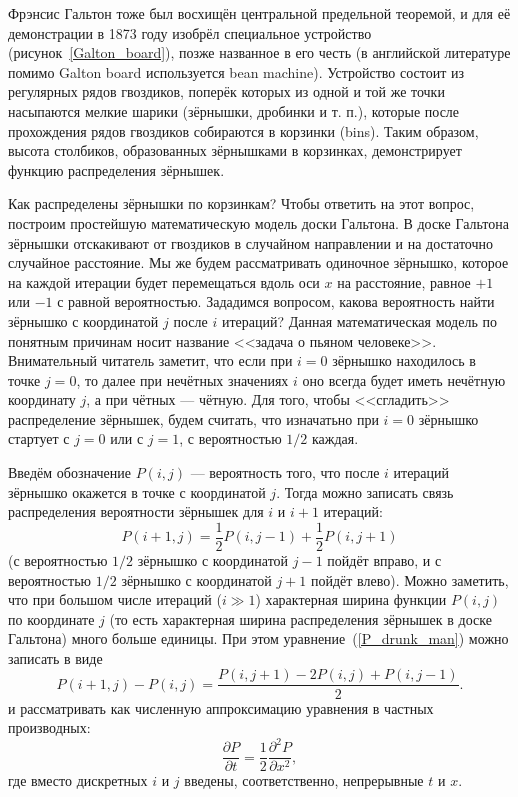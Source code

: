\documentclass{book}
\begin{document}
Фрэнсис Гальтон тоже был восхищён центральной предельной теоремой, и для её демонстрации в 1873
году изобрёл специальное устройство (рисунок~\ref{Galton_board}), позже названное в его честь (в
английской литературе помимо Galton board используется bean machine). Устройство состоит из
регулярных рядов гвоздиков, поперёк которых из одной и той же точки насыпаются мелкие шарики
(зёрнышки, дробинки и т. п.), которые после прохождения рядов гвоздиков собираются в корзинки
(bins). Таким образом, высота столбиков, образованных зёрнышками в корзинках, демонстрирует функцию
распределения зёрнышек.

Как распределены зёрнышки по корзинкам? Чтобы ответить на этот вопрос, построим простейшую
математическую модель доски Гальтона. В доске Гальтона зёрнышки отскакивают от гвоздиков в
случайном направлении и на достаточно случайное расстояние. Мы же будем рассматривать одиночное
зёрнышко, которое на каждой итерации будет перемещаться вдоль оси $x$ на расстояние, равное $+1$
или $-1$ с равной вероятностью. Зададимся вопросом, какова вероятность найти зёрнышко с координатой
$j$ после $i$ итераций?  Данная математическая модель по понятным причинам носит название
<<задача о пьяном человеке>>.  Внимательный читатель заметит, что если при $i = 0$ зёрнышко
находилось в точке $j = 0$, то далее при нечётных значениях $i$ оно всегда будет иметь нечётную
координату $j$, а при чётных --- чётную.  Для того, чтобы <<сгладить>> распределение зёрнышек,
будем считать, что изначатьно при $i = 0$ зёрнышко стартует с $j = 0$ или с $j = 1$, с вероятностью
$1/2$ каждая.


Введём обозначение $P(i, j)$ --- вероятность того, что после $i$ итераций зёрнышко окажется в точке с
координатой $j$. Тогда можно записать связь распределения вероятности зёрнышек для $i$ и $i+1$
итераций:
\begin{equation}
    \label{P_drunk_man}
    P(i+1, j) = \frac{1}{2} P(i, j - 1) + \frac{1}{2} P(i, j + 1)
\end{equation}
(с вероятностью $1/2$ зёрнышко с координатой $j - 1$ пойдёт вправо, и с вероятностью $1/2$ зёрнышко
с координатой $j + 1$ пойдёт влево).
Можно заметить, что при большом числе итераций ($i \gg 1$) характерная ширина
функции $P(i, j)$ по координате $j$ (то есть характерная ширина распределения зёрнышек в доске
Гальтона) много больше единицы. При этом уравнение~(\ref{P_drunk_man}) можно записать в виде
\begin{equation}
    P(i+1, j) - P(i, j) = \frac{P(i, j + 1) - 2 P(i, j) + P(i, j - 1)}{2}.
\end{equation}
и рассматривать как численную аппроксимацию уравнения в частных производных:
\begin{equation}
    \label{heat_equation}
    \frac{\partial P}{\partial t} = \frac{1}{2} \frac{\partial^2 P}{\partial x^2},
\end{equation}
где вместо дискретных $i$ и $j$ введены, соответственно, непрерывные $t$ и $x$.
\end{document}
